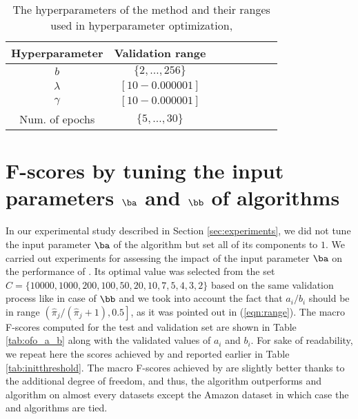 \vspace{\tableBefore}
\begin{table}[ht!]
\caption{The hyperparameters of the  method and their ranges used in hyperparameter optimization,}
\label{tab:hyppar}
\begin{center}
\begin{tabular}{|c|c|c|c|c|c|c|c|}
\hline
Hyperparameter & Validation range \\%
\hline
$b$ & $\{2,\dots,256\}$ \\%
$\lambda$ &  $[10 - 0.000001]$ \\%
$\gamma$ &  $[10 - 0.000001]$ \\%
Num. of epochs &  $\{ 5, \dots , 30\} $ \\
\hline
\end{tabular}
\end{center}
\end{table}
\vspace{\tableAfter}




\section{F-scores by tuning the input parameters $\ba$ and $\bb$ of  algorithms}
\label{sec:OFO_a_b}

In our experimental study described in Section \ref{sec:experiments}, we did not tune the input parameter $\ba$ of the  algorithm but set all of its components to $1$. We carried out experiments for assessing the impact of the input parameter $\ba$ on the performance of . Its optimal value was selected from the set $C = \{10000,1000,200,100,50,20,10,7,5,4,3,2\}$ based on the same validation process like in case of $\bb$ and we took into account the fact that $a_i /b_i$ should be in range $\left (\hat\pi_j / (\hat\pi_j + 1), 0.5 \right ]$, as it was pointed out in (\ref{eqn:range}). The macro F-scores computed for the test and validation set are shown in Table \ref{tab:ofo_a_b} along with the validated values of $a_i$ and $b_i$. For sake of readability, we repeat here the scores achieved by  and  reported earlier in Table \ref{tab:initthreshold}. The macro F-scores achieved by  are slightly better thanks to the additional degree of freedom, and thus, the  algorithm outperforms  and  algorithm on almost every datasets except the Amazon dataset in which case the  and  algorithms are tied.

